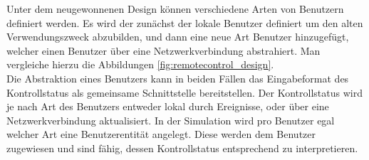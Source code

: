 Unter dem neugewonnenen Design können verschiedene Arten von Benutzern definiert werden. Es wird der zunächst der lokale Benutzer definiert um den alten Verwendungszweck abzubilden, und dann eine neue Art Benutzer hinzugefügt, welcher einen Benutzer über eine Netzwerkverbindung abstrahiert. Man vergleiche hierzu die Abbildungen \ref{fig:remotecontrol_design}.\\
Die Abstraktion eines Benutzers kann in beiden Fällen das Eingabeformat des Kontrollstatus als gemeinsame Schnittstelle bereitstellen. Der Kontrollstatus wird je nach Art des Benutzers entweder lokal durch Ereignisse, oder über eine Netzwerkverbindung aktualisiert. 
In der Simulation wird pro Benutzer egal welcher Art eine Benutzerentität angelegt.
Diese werden dem Benutzer zugewiesen und sind fähig, dessen Kontrollstatus entsprechend zu interpretieren.
